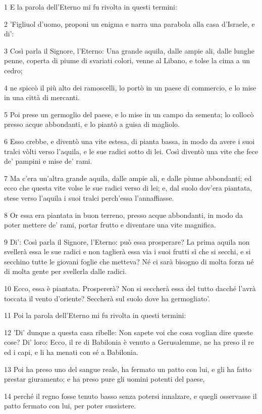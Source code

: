 \par 1 E la parola dell'Eterno mi fu rivolta in questi termini:
\par 2 'Figliuol d'uomo, proponi un enigma e narra una parabola alla casa d'Israele, e di':
\par 3 Così parla il Signore, l'Eterno: Una grande aquila, dalle ampie ali, dalle lunghe penne, coperta di piume di svariati colori, venne al Libano, e tolse la cima a un cedro;
\par 4 ne spiccò il più alto dei ramoscelli, lo portò in un paese di commercio, e lo mise in una città di mercanti.
\par 5 Poi prese un germoglio del paese, e lo mise in un campo da sementa; lo collocò presso acque abbondanti, e lo piantò a guisa di magliolo.
\par 6 Esso crebbe, e diventò una vite estesa, di pianta bassa, in modo da avere i suoi tralci vòlti verso l'aquila, e le sue radici sotto di lei. Così diventò una vite che fece de' pampini e mise de' rami.
\par 7 Ma c'era un'altra grande aquila, dalle ampie ali, e dalle piume abbondanti; ed ecco che questa vite volse le sue radici verso di lei; e, dal suolo dov'era piantata, stese verso l'aquila i suoi tralci perch'essa l'annaffiasse.
\par 8 Or essa era piantata in buon terreno, presso acque abbondanti, in modo da poter mettere de' rami, portar frutto e diventare una vite magnifica.
\par 9 Di': Così parla il Signore, l'Eterno: può essa prosperare? La prima aquila non svellerà essa le sue radici e non taglierà essa via i suoi frutti sì che si secchi, e si secchino tutte le giovani foglie che metteva? Né ci sarà bisogno di molta forza né di molta gente per svellerla dalle radici.
\par 10 Ecco, essa è piantata. Prospererà? Non si seccherà essa del tutto dacché l'avrà toccata il vento d'oriente? Seccherà sul suolo dove ha germogliato'.
\par 11 Poi la parola dell'Eterno mi fu rivolta in questi termini:
\par 12 'Di' dunque a questa casa ribelle: Non sapete voi che cosa voglian dire queste cose? Di' loro: Ecco, il re di Babilonia è venuto a Gerusalemme, ne ha preso il re ed i capi, e li ha menati con sé a Babilonia.
\par 13 Poi ha preso uno del sangue reale, ha fermato un patto con lui, e gli ha fatto prestar giuramento; e ha preso pure gli uomini potenti del paese,
\par 14 perché il regno fosse tenuto basso senza potersi innalzare, e quegli osservasse il patto fermato con lui, per poter sussistere.

